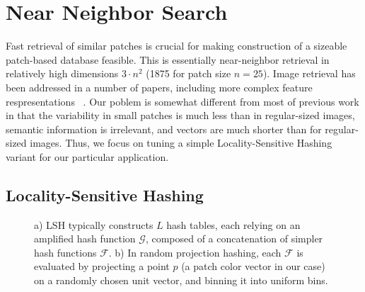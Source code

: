 \section{Near Neighbor Search}\label{sec:nn}

Fast retrieval of similar patches is crucial for making
construction of a sizeable patch-based database feasible.
This is essentially near-neighbor retrieval in
relatively high dimensions $3 \cdot n^2$ (1875 for patch size $n=25$).
Image retrieval has been addressed in a number of papers,
including more complex feature respresentations ~\cite{perronnin2010large}.
Our poblem is somewhat different from most of previous work
in that the variability
in small patches is much less than in regular-sized images,
semantic information is irrelevant, and vectors are much shorter
than for regular-sized images.
Thus, we focus on tuning a simple Locality-Sensitive Hashing variant for our
particular application.

\subsection{Locality-Sensitive Hashing}

\begin{figure}[ht!]
\centering
{}
\label{fig:lsh}
\caption{a) LSH typically constructs
$L$ hash tables, each relying on an amplified
hash function $\mathcal{G}$, composed of a concatenation
of simpler hash functions $\mathcal{F}$. b) In
random projection hashing, each
$\mathcal{F}$ is evaluated by projecting a point $p$
(a patch color vector in our case) on a randomly chosen
unit vector, and binning it into uniform bins.}
\end{figure}

